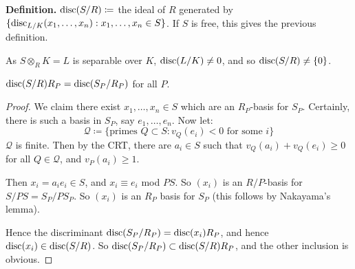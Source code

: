 \documentclass[10pt,a4paper]{article}
\begin{document}
\textbf{Definition.} $\operatorname{disc}(S/R) \coloneqq$ the ideal of $R$ generated by $\{\operatorname{disc}_{L/K}(x_1, \ldots, x_n) : x_1, \ldots, x_n \in S\}$. If $S$ is free, this gives the previous definition.

As $S \otimes_R K = L$ is separable over $K$, $\operatorname{disc}(L/K) \neq 0$, and so $\operatorname{disc}(S/R) \neq \{0\}$.
\begin{proposition}
  $\operatorname{disc}(S/R) R_P = \operatorname{disc}(S_P/R_P)$ for all $P$.
\end{proposition}
\begin{proof}
  We claim there exist $x_1, \ldots, x_n \in S$ which are an $R_P$-basis for $S_P$. Certainly, there is such a basis in $S_P$, say $e_1, \ldots, e_n$. Now let:
  \[\mathscr{Q} \coloneqq \{\text{primes }Q\subset S : v_Q(e_i) < 0\text{ for some $i$}\}\]
  $\mathscr{Q}$ is finite. Then by the CRT, there are $a_i \in S$ such that $v_Q(a_i) + v_Q(e_i) \geq 0$ for all $Q \in \mathscr{Q}$, and $v_P(a_i) \geq 1$.

  Then $x_i = a_ie_i \in S$, and $x_i\equiv e_i$ mod $PS$. So $(x_i)$ is an $R/P$-basis for $S/PS = S_P/PS_P$. So $(x_i)$ is an $R_P$ basis for $S_P$ (this follows by Nakayama's lemma).

  Hence the discriminant $\operatorname{disc}(S_P/R_P) = \operatorname{disc}(x_i)R_P$, and hence $\operatorname{disc}(x_i) \in \operatorname{disc}(S/R)$. So $\operatorname{disc}(S_P/R_P) \subset \operatorname{disc}(S/R)R_P$, and the other inclusion is obvious.
\end{proof}
\end{document}
